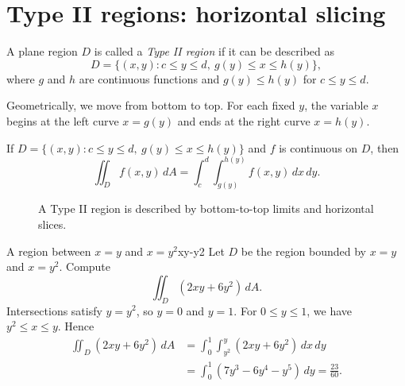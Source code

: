\documentclass[11pt]{article}
\begin{document}
\section{Type II regions: horizontal slicing}

A plane region $D$ is called a \emph{Type II region} if it can be described as
\[
D=\{(x,y):c\le y\le d,\ g(y)\le x\le h(y)\},
\]
where $g$ and $h$ are continuous functions and $g(y)\le h(y)$ for $c\le y\le d$.

Geometrically, we move from bottom to top. For each fixed $y$, the variable $x$ begins at the left curve $x=g(y)$ and ends at the right curve $x=h(y)$.

\begin{importantbox}
If $D=\{(x,y):c\le y\le d,\ g(y)\le x\le h(y)\}$ and $f$ is continuous on $D$, then
\[
\iint_D f(x,y)\,dA=\int_c^d\int_{g(y)}^{h(y)}f(x,y)\,dx\,dy.
\]
\end{importantbox}

\begin{figure}[H]
\centering
{}
\caption{A Type II region is described by bottom-to-top limits and horizontal slices.}
\end{figure}

\begin{examplebox}{A region between $x=y$ and $x=y^2$}{xy-y2}
Let $D$ be the region bounded by $x=y$ and $x=y^2$. Compute
\[
\iint_D(2xy+6y^2)\,dA.
\]
Intersections satisfy $y=y^2$, so $y=0$ and $y=1$. For $0\le y\le 1$, we have $y^2\le x\le y$. Hence
\[
\begin{aligned}
\iint_D(2xy+6y^2)\,dA
&=\int_0^1\int_{y^2}^{y}(2xy+6y^2)\,dx\,dy \\
&=\int_0^1(7y^3-6y^4-y^5)\,dy
=\frac{23}{60}.
\end{aligned}
\]
\end{examplebox}
\end{document}
